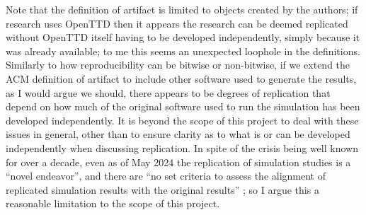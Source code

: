 \documentclass[logo,msc,dsti]{style/infthesis}    %
\begin{document}
Note that the definition of artifact is limited to objects created by the authors; if research uses OpenTTD then it appears the research can be deemed replicated without OpenTTD itself having to be developed independently, simply because it was already available; to me this seems an unexpected loophole in the definitions. Similarly to how reproducibility can be bitwise or non-bitwise, if we extend the ACM definition of artifact to include other software used to generate the results, as I would argue we should, there appears to be degrees of replication that depend on how much of the original software used to run the simulation has been developed independently. It is beyond the scope of this project to deal with these issues in general, other than to ensure clarity as to what is or can be developed independently when discussing replication. In spite of the crisis being well known for over a decade, even as of May 2024 the replication of simulation studies is a ``novel endeavor'', 
and there are ``no set criteria to assess the alignment of replicated simulation results with the original results'' \cite{luijken2024replicability}; so I argue this a reasonable limitation to the scope of this project.






\end{document}
